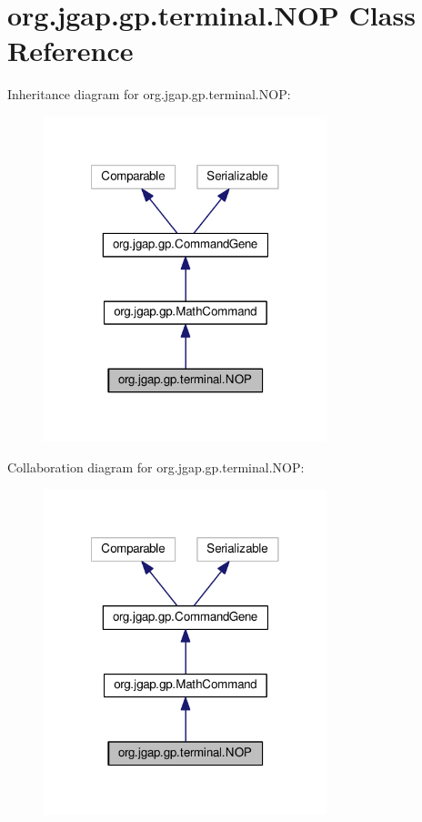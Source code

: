 \hypertarget{classorg_1_1jgap_1_1gp_1_1terminal_1_1_n_o_p}{\section{org.\-jgap.\-gp.\-terminal.\-N\-O\-P Class Reference}
\label{classorg_1_1jgap_1_1gp_1_1terminal_1_1_n_o_p}
}


Inheritance diagram for org.\-jgap.\-gp.\-terminal.\-N\-O\-P\-:
\nopagebreak
\begin{figure}[H]
\begin{center}
\leavevmode
\includegraphics[width=233pt]{classorg_1_1jgap_1_1gp_1_1terminal_1_1_n_o_p__inherit__graph}
\end{center}
\end{figure}


Collaboration diagram for org.\-jgap.\-gp.\-terminal.\-N\-O\-P\-:
\nopagebreak
\begin{figure}[H]
\begin{center}
\leavevmode
\includegraphics[width=233pt]{classorg_1_1jgap_1_1gp_1_1terminal_1_1_n_o_p__coll__graph}
\end{center}
\end{figure}
